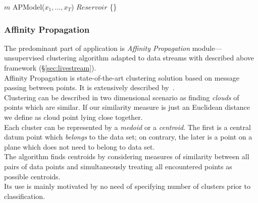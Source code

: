 \documentclass[11pt, letterpaper]{article}            %
\begin{document}
\SetAlCapSkip{1em}
\LinesNumbered
{}
\vspace{2cm}
\begin{algorithm}[h]

  $m$ \leftarrow APModel($x_1, ..., x_T$)\;
  $Reservoir$ \leftarrow \{\}\;

\end{algorithm}
\vspace{1cm}


\subsubsection{Affinity Propagation}
The predominant part of application is \emph{Affinity Propagation} module---unsupervised clustering algorithm adapted to data streams with described above framework (§\ref{sec:livestream}).\\

Affinity Propagation is state-of-the-art clustering solution based on message passing between points. It is extensively described by~\citep{frey07affinitypropagation}.\\
Clustering can be described in two dimensional scenario as finding \emph{clouds} of points which are similar. If our similarity measure is just an Euclidean distance we define as cloud point lying close together.\\
Each cluster can be represented by a \emph{medoid} or a \emph{centroid}. The first is a central datum point which \emph{belongs} to the data set; on contrary, the later is a point on a plane which does not need to belong to data set.\\
The algorithm finds centroids by considering measures of similarity between all pairs of data points and simultaneously treating all encountered points as possible centroids.\\
Its use is mainly motivated by no need of specifying number of clusters prior to classification.\\
\end{document}
